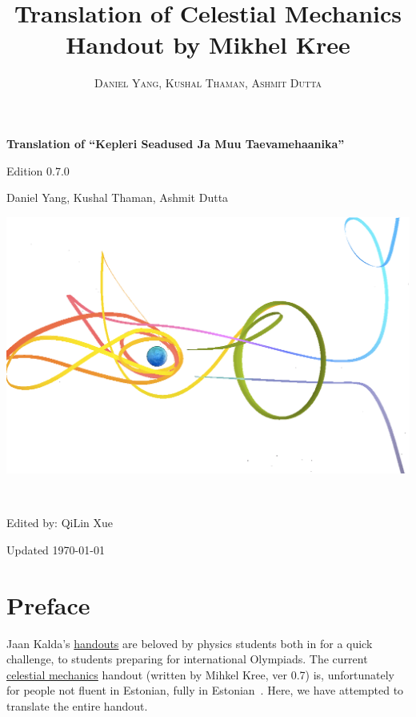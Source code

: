 \documentclass[11pt]{article}
\title{Translation of Celestial Mechanics Handout by Mikhel Kree}
\author{\textsc{Daniel Yang, Kushal Thaman, Ashmit Dutta}}
\begin{document}
\begin{titlepage}
    \begin{center}
        \vspace*{1cm}
 
        \Huge
        \textbf{Translation of “Kepleri Seadused Ja Muu Taevamehaanika”}
 
        \vspace{0.5cm}
        \LARGE
        Edition 0.7.0
        
        \vspace{0.5cm}
        Daniel Yang, Kushal Thaman, Ashmit Dutta
        
        \begin{center}
            \includegraphics[width=0.95\linewidth]{Images/halo_orbit_title.png}
        \end{center}
        \normalsize
        ~\cite{haloSE}

        \vspace{1mm}
        \Large
        Edited by: QiLin Xue
        
        \Large
        Updated
        \today
 
    \end{center}
\end{titlepage}
\newpage
\section*{Preface}
\vspace{-5mm}
\indent Jaan Kalda's \href{https://www.ioc.ee/~kalda/ipho/}{handouts} are beloved by physics students both in for a quick challenge, to students preparing for international Olympiads. The current \href{https://www.ioc.ee/~kalda/ipho/kepler.pdf}{celestial mechanics} handout (written by Mihkel Kree, ver 0.7) is, unfortunately for people not fluent in Estonian, fully in Estonian~\cite{kaldakepler}. Here, we have attempted to translate the entire handout.
\end{document}
